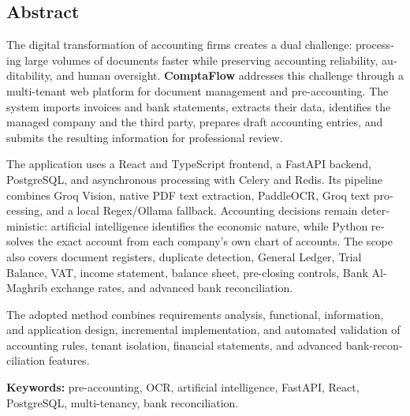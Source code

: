 \documentclass[12pt,a4paper,oneside]{report}
\begin{document}
\begin{otherlanguage}{english}
\chapter*{Abstract}

The digital transformation of accounting firms creates a dual challenge: processing large volumes of documents faster while preserving accounting reliability, auditability, and human oversight. \textbf{ComptaFlow} addresses this challenge through a multi-tenant web platform for document management and pre-accounting. The system imports invoices and bank statements, extracts their data, identifies the managed company and the third party, prepares draft accounting entries, and submits the resulting information for professional review.

The application uses a React and TypeScript frontend, a FastAPI backend, PostgreSQL, and asynchronous processing with Celery and Redis. Its pipeline combines Groq Vision, native PDF text extraction, PaddleOCR, Groq text processing, and a local Regex/Ollama fallback. Accounting decisions remain deterministic: artificial intelligence identifies the economic nature, while Python resolves the exact account from each company's own chart of accounts. The scope also covers document registers, duplicate detection, General Ledger, Trial Balance, VAT, income statement, balance sheet, pre-closing controls, Bank Al-Maghrib exchange rates, and advanced bank reconciliation.

The adopted method combines requirements analysis, functional, information, and application design, incremental implementation, and automated validation of accounting rules, tenant isolation, financial statements, and advanced bank-reconciliation features.

\textbf{Keywords:} pre-accounting, OCR, artificial intelligence, FastAPI, React, PostgreSQL, multi-tenancy, bank reconciliation.
\end{otherlanguage}

\begingroup
\footnotesize
\tableofcontents
\endgroup
\listoffigures
\listoftables
\end{document}
